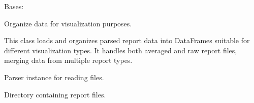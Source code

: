 \documentclass[a4paper,11pt,english,openany,oneside]{sphinxmanual}
\begin{document}
\begin{fulllineitems}
\label{\detokenize{modules/core:core.analysis.DataOrganizer}}
\pysigstartsignatures
\pysiglinewithargsret
{}
{}
{}
\pysigstopsignatures
\sphinxAtStartPar
Bases: 

\sphinxAtStartPar
Organize data for visualization purposes.

\sphinxAtStartPar
This class loads and organizes parsed report data into DataFrames
suitable for different visualization types. It handles both averaged
and raw report files, merging data from multiple report types.

\begin{fulllineitems}
\label{\detokenize{modules/core:core.analysis.DataOrganizer.parser}}
\pysigstartsignatures
\pysigline
{}
\pysigstopsignatures
\sphinxAtStartPar
Parser instance for reading files.
\begin{quote}\begin{description}
\sphinxAtStartPar
{\hyperref[\detokenize{modules/core:core.analysis.SmartFileParser}]{}}

\end{description}\end{quote}

\end{fulllineitems}


\begin{fulllineitems}
\label{\detokenize{modules/core:core.analysis.DataOrganizer.report_dir}}
\pysigstartsignatures
\pysigline
{}
\pysigstopsignatures
\sphinxAtStartPar
Directory containing report files.
\begin{quote}\begin{description}
\sphinxAtStartPar
{}


\end{description}
\end{quote}
\end{fulllineitems}
\end{fulllineitems}
\end{document}
